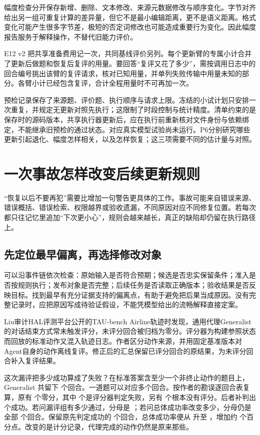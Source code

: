 幅度检查分开保存新增、删除、文本修改、来源元数据修改与顺序变化。字节对齐给出另一组可重复计算的差异量，但它不是最小编辑距离，更不是语义距离。格式变化可能产生很多字节差，极短的否定词修改也可能造成重要行为变化。因此幅度报告服务于解释操作，不替代旧能力评价。

E12 v2 把共享准备费用记一次，共同基线评价另列。每个更新臂的专属小计合并了更新后做题和恢复后复评的用量。要回答“复评又花了多少”，需按调用日志中的回合编号挑出该臂的复评请求，核对已知用量，并单列失败传输中用量未知的部分。各臂小计已经包含复评，合计全程用量时不可再加一次。

预检记录保存了来源题、评价题、执行顺序与请求上限。冻结的小试计划只安排一次重复，并规定无更新对照先执行；这限制了时段控制与统计精度。清单约束的是保存时的源码版本，共享执行器更新后，应在执行前重新核对文件身份与依赖绑定，不能继承旧预检的通过状态。对应真实模型试验尚未运行。P6分别研究哪些更新引起退化、幅度怎样相关，以及怎样恢复；这三项需要不同的估计量与对照。


\section{一次事故怎样改变后续更新规则}
\label{sec:ch14-incident-learning}

“恢复以后不要再犯”需要比增加一句警告更具体的工作。事故可能来自错误来源、错误概括、错误检索、权限越界或验收遗漏，不同原因对应不同修复位置。若每次都只往记忆里追加“下次更小心”，规则会越来越长，真正的缺陷却仍留在执行路径上。

\subsection{先定位最早偏离，再选择修改对象}

可以沿事件链依次检查：原始输入是否符合预期；候选是否忠实保留条件；准入是否按规则执行；发布对象是否完整；后续任务是否读取正确版本；验收结果是否反映目标。找到最早有充分证据支持的偏离点，有助于避免把后果当成原因。没有完整记录时，应把原因写成待验证假设，不能凭模型给出的流畅解释直接定案。

Liu审计HAL评测平台公开的TAU-bench Airline轨迹时发现，通用代理Generalist的对话结束方式常未触发评分，未评分回合被归档为零分。评分器为构建参照状态而回放的标准动作又混入轨迹日志。作者区分动作来源，并用固定基准版本对Agent自身的动作离线复评。修正后的汇总保留已评分回合的原结果，为未评分回合补入复评结果\cite{silent-instrument-2611}。

这次漏评把多少成功算成了失败？在标准答案含至少一个非终止动作的题目上，Generalist 共留下  个回合。一道题可以对应多个回合。按作者的勘误逐回合表复算，原有  个零分，其中  个是评分器判定失败，另有  个根本没有评分。后者补判出  个成功。若问漏评组有多少通过，分母是 ；若问总体成功率改变多少，分母仍是全部  个回合。保留原先判定成功的  个回合，总体成功率便从  升至 ，增加约  个百分点。改变的是计分记录，代理完成的动作仍然是原来那些。

